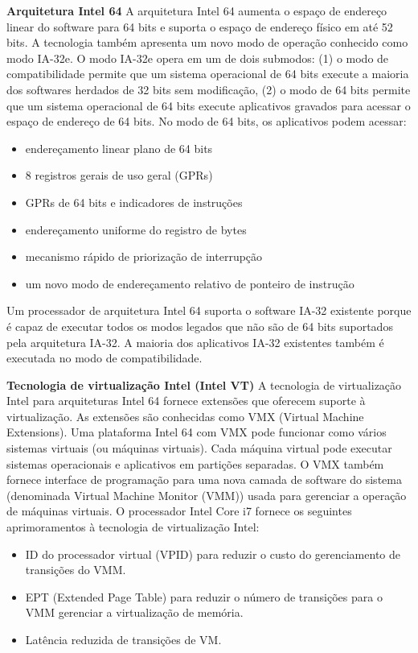 \documentclass[12pt,a4paper,brazilian,utf8]{ppgsi}
\begin{document}
    \textbf{Arquitetura Intel 64}
    A arquitetura Intel 64 aumenta o espaço de endereço linear do software para 64 bits e suporta o espaço de endereço físico em até 52 bits. A tecnologia também apresenta um novo modo de operação conhecido como modo IA-32e. O modo IA-32e opera em um de dois submodos: (1) o modo de compatibilidade permite que um sistema operacional de 64 bits execute a maioria dos softwares herdados de 32 bits sem modificação, (2) o modo de 64 bits permite que um sistema operacional de 64 bits execute aplicativos gravados para acessar o espaço de endereço de 64 bits. No modo
    de 64 bits, os aplicativos podem acessar:
    \begin{itemize}
        \item endereçamento linear plano de 64 bits
        \item 8 registros gerais de uso geral (GPRs)
        \item GPRs de 64 bits e indicadores de instruções
        \item endereçamento uniforme do registro de bytes
        \item mecanismo rápido de priorização de interrupção
        \item um novo modo de endereçamento relativo de ponteiro de instrução
    \end{itemize}
    Um processador de arquitetura Intel 64 suporta o software IA-32 existente porque é capaz de executar todos os modos legados que não são de 64 bits suportados pela arquitetura IA-32. A maioria dos aplicativos IA-32 existentes também é executada no modo de compatibilidade. 
    
    \textbf{Tecnologia de virtualização Intel (Intel VT)}
    A tecnologia de virtualização Intel para arquiteturas Intel 64 fornece extensões que oferecem suporte à virtualização. As extensões são conhecidas como VMX (Virtual Machine Extensions). Uma plataforma Intel 64 com VMX pode funcionar como vários sistemas virtuais (ou máquinas virtuais). Cada máquina virtual pode executar sistemas operacionais e aplicativos em partições separadas. O VMX também fornece interface de programação para uma nova camada de software do sistema (denominada Virtual Machine Monitor (VMM)) usada para gerenciar a operação de máquinas virtuais. O processador Intel Core i7 fornece os seguintes aprimoramentos à tecnologia de virtualização Intel:
    \begin{itemize}
        \item ID do processador virtual (VPID) para reduzir o custo do gerenciamento de transições do VMM.
        \item EPT (Extended Page Table) para reduzir o número de transições para o VMM gerenciar a virtualização de memória.
        \item Latência reduzida de transições de VM.
    \end{itemize}
\end{document}

